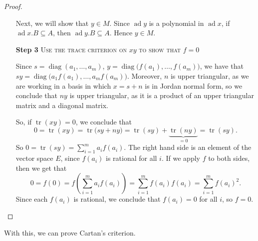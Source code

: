 \documentclass{article}
\DeclareMathOperator{\tr}{tr}
\DeclareMathOperator{\diag}{diag}
\newcommand*\ad{\operatorname{ad}}
\begin{document}
\begin{proof}
\begin{itemize}
            Next, we will show that $y \in M$.
            Since $\ad y$ is a polynomial in $\ad x$, if $\ad x.B \subseteq A$, then $\ad y.B \subseteq A$.
            Hence $y \in M$.

        \item[\textbf{Step 3}]
            \textsc{\color{Crimson} Use the trace criterion on $xy$ to show that $f = 0$}

            Since $s = \diag(a_1,\ldots,a_m)$, $y = \diag\big(f(a_1),\ldots,f(a_m)\big)$, we have that $sy = \diag\big(a_1f(a_1),\ldots,a_mf(a_m)\big)$.
            Moreover, $n$ is upper triangular, as we are working in a basis in which $x = s+n$ is in Jordan normal form, so we conclude that $ny$ is upper triangular, as it is a product of an upper triangular matrix and a diagonal matrix.

            So, if $\tr(xy) = 0$, we conclude that 
            \[
                0
                =
                \tr(xy)
                =
                \tr\big(sy + ny\big)
                =
                \tr(sy) + \underbrace{\tr(ny)}_{=0}
                =
                \tr(sy).
            \]
            So $0 = \tr(sy) = \sum_{i=1}^m a_if(a_i)$.
            The right hand side is an element of the vector space $E$, since $f(a_i)$ is rational for all $i$.
            If we apply $f$ to both sides, then we get that 
            \[
                0
                =
                f(0)
                =
                f\left(
                    \sum_{i=1}^m
                    a_if(a_i)
                \right)
                =
                \sum_{i=1}^m
                f(a_i)
                f(a_i)
                =
                \sum_{i=1}^mf(a_i)^2.
            \]
            Since each $f(a_i)$ is rational, we conclude that $f(a_i) = 0$ for all $i$, so $f = 0$.
    \end{itemize}
\end{proof}

With this, we can prove Cartan's criterion.
\end{document}
